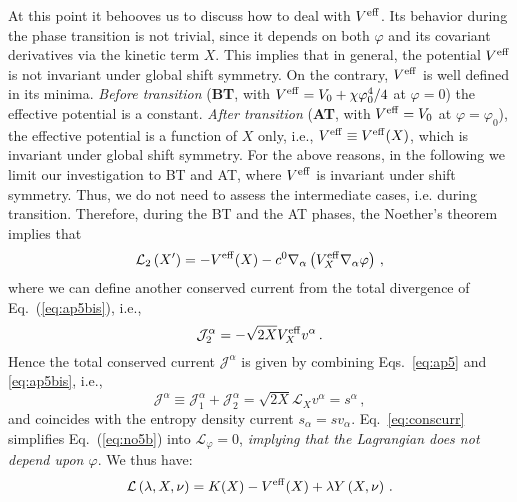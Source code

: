 \documentclass[twocolumn,showpacs, nofootinbib,aps,superscriptaddress, eqsecnum,prd,prl,notitlepage,showkeys,10pt,reprint]{revtex4-1}
\begin{document}
At this point it behooves us to discuss how to deal with $V^{\rm eff}$.
Its behavior during the phase transition is not trivial, since it depends on both $\varphi$ and its covariant derivatives via the kinetic term $X$.
This implies that in general, the potential $V^{\rm eff}$ is not invariant under global shift symmetry. On the contrary, $V^{\rm eff}$ is well defined in its minima.
\textit{Before transition} (\textbf{BT}, with $V^{\rm eff}=V_0+\chi \varphi_0^4/4$ at $\varphi=0$) the effective potential is a constant. \textit{After transition} (\textbf{AT}, with $V^{\rm eff}=V_0$ at $\varphi=\varphi_0$), the effective potential is a function of $X$ only, i.e., $V^{\rm eff}\equiv V^{\rm eff}(X)$, which is invariant under global shift symmetry.
For the above reasons, in the following we limit our investigation to BT and AT, where $V^{\rm eff}$ is invariant under shift symmetry. Thus, we do not need to assess the intermediate cases, i.e. during transition.
Therefore, during the BT and the AT phases, the Noether's theorem implies that
%
\begin{equation}
\label{eq:ap5bis}
\mathcal{L}_2\left(X^\prime\right) = - V^{\rm eff}(X)- c^0 \nabla_\alpha\left(V^{\rm eff}_X \nabla_\alpha\varphi\right)\,,
\end{equation}
%
where we can define another conserved current from the total divergence of Eq.~(\ref{eq:ap5bis}), i.e.,
%
\begin{equation}
\label{eq:conscurr1bis}
\mathcal{J}_2^\alpha = -\sqrt{2X} V^{\rm eff}_X v^\alpha\,.
\end{equation}
%
Hence the total conserved current $\mathcal{J^\alpha}$ is given by combining Eqs.~\eqref{eq:ap5} and \eqref{eq:ap5bis}, i.e.,
%
\begin{equation}
\label{eq:conscurr}
\mathcal{J}^\alpha \equiv \mathcal{J}_1^\alpha + \mathcal{J}_2^\alpha = \sqrt{2X} \mathcal{L}_X v^\alpha = s^\alpha\,,
\end{equation}
%
and coincides with the entropy density current $s_\alpha=sv_\alpha$.
Eq.~\eqref{eq:conscurr} simplifies Eq.~(\ref{eq:no5b}) into $\mathcal{L}_\varphi = 0$, \emph{implying that the Lagrangian does not depend upon $\varphi$}. We thus have:
%
\begin{equation}
\label{eq:1new}
\mathcal{L}\left(\lambda,X,\nu\right) = K(X) - V^{\rm eff}(X) + \lambda Y \left(X,\nu\right)\,.
\end{equation}
\end{document}
